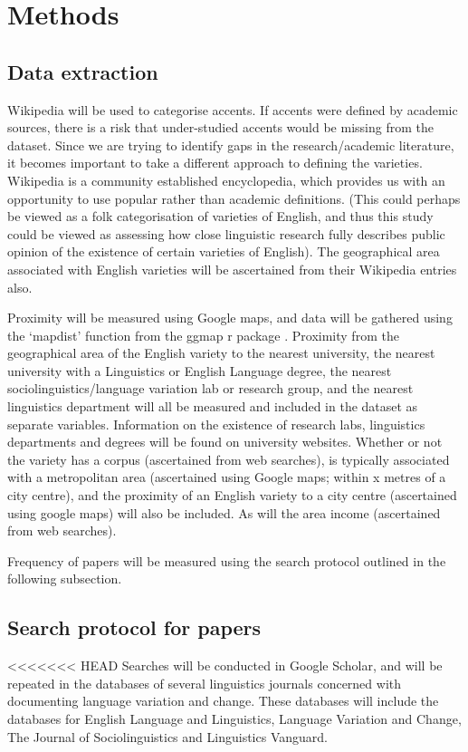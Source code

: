 \documentclass[review]{article}
\begin{document}
	
\section{Methods}




\subsection{Data extraction}
Wikipedia will be used to categorise accents. If accents were defined by academic sources, there is a risk that under-studied accents would be missing from the dataset. Since we are trying to identify gaps in the research/academic literature, it becomes important to take a different approach to defining the varieties. Wikipedia is a community established encyclopedia, which provides us with an opportunity to use popular rather than academic definitions. (This could perhaps be viewed as a folk categorisation of varieties of English, and thus this study could be viewed as assessing how close linguistic research fully describes public opinion of the existence of certain varieties of English). The geographical area associated with English varieties will be ascertained from their Wikipedia entries also.

Proximity will be measured using Google maps, and data will be gathered using the `mapdist' function from the ggmap r package \cite{kahle2013ggmap,R2018}. Proximity from the geographical area of the English variety to the nearest university, the nearest university with a Linguistics or English Language degree, the nearest sociolinguistics/language variation lab or research group, and the nearest linguistics department will all be measured and included in the dataset as separate variables. Information on the existence of research labs, linguistics departments and degrees will be found on university websites. Whether or not the variety has a corpus (ascertained from web searches), is typically associated with a metropolitan area (ascertained using Google maps; within x metres of a city centre), and the proximity of an English variety to a city centre (ascertained using google maps) will also be included. As will the area income (ascertained from web searches).

Frequency of papers will be measured using the search protocol outlined in the following subsection. 

\subsection{Search protocol for papers}
<<<<<<< HEAD
Searches will be conducted in Google Scholar, and will be repeated in the databases of several linguistics journals concerned with documenting language variation and change. These databases will include the databases for English Language and Linguistics, Language Variation and Change, The Journal of Sociolinguistics and Linguistics Vanguard.
\end{document}
